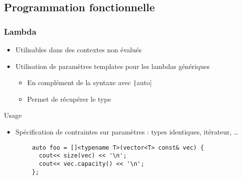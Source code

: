 \documentclass[C++.tex]{subfiles}
\begin{document}
\subsection*{Programmation fonctionnelle}
\begin{frame}[fragile]
	\frametitle{Lambda}
	\begin{itemize}
		\item Utilisables dans des contextes non évalués


		\item Utilisation de paramètres templates pour les lambdas génériques
		\begin{itemize}
			\item En complément de la syntaxe avec \texttt|auto|


			\item Permet de récupérer le type
		\end{itemize}
	\end{itemize}

	\begin{block}{Usage}
		\begin{itemize}
			\item Spécification de contraintes sur paramètres : types identiques, itérateur, \ldots{}
		\end{itemize}
	\end{block}

	\begin{verbatim}
		auto foo = []<typename T>(vector<T> const& vec) { 
		  cout<< size(vec) << '\n';
		  cout<< vec.capacity() << '\n';
		};
	\end{verbatim}


\end{frame}
\end{document}
